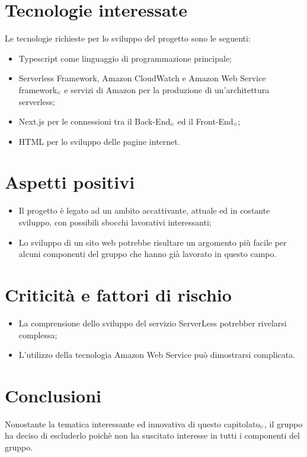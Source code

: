 \section{Tecnologie interessate} \label{C2TecnologieInteressate}
Le tecnologie richieste per lo sviluppo del progetto sono le seguenti:
\begin{itemize}
	\item Typescript come linguaggio di programmazione principale;
	\item Serverless Framework, Amazon CloudWatch e Amazon Web Service framework$_{\scaleto{G}{3pt}}$ e servizi di Amazon per la produzione di un'architettura serverless;
	\item Next.js per le connessioni tra il Back-End$_{\scaleto{G}{3pt}}$ ed il Front-End$_{\scaleto{G}{3pt}}$;
	\item HTML per lo sviluppo delle pagine internet.
\end{itemize}
\section{Aspetti positivi} \label{C2AspettiPositivi}
\begin{itemize}
	\item Il progetto è legato ad un ambito accattivante, attuale ed in costante sviluppo,
	con possibili sbocchi lavorativi interessanti;
	\item Lo sviluppo di un sito web potrebbe risultare un argomento più facile per alcuni componenti del gruppo che hanno già lavorato in questo campo.
\end{itemize}
\section{Criticità e fattori di rischio} \label{C2CriticitàEFattoriDiRischio}
\begin{itemize}
	\item La comprensione dello sviluppo del servizio ServerLess potrebber rivelarsi complessa;
	\item L'utilizzo della tecnologia Amazon Web Service può dimostrarsi complicata.
\end{itemize}
\section{Conclusioni} \label{C2Conclusioni}
Nonostante la tematica interessante ed innovativa di questo capitolato$_{\scaleto{G}{3pt}}$, il gruppo ha deciso di escluderlo poichè non ha suscitato interesse in tutti i componenti del gruppo.